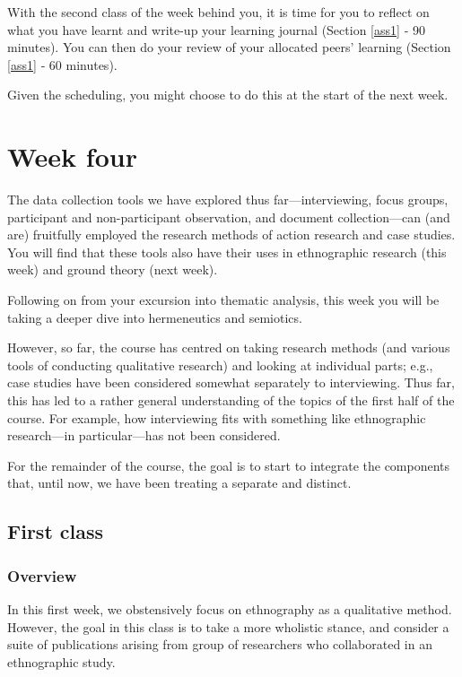 \documentclass[]{book}
\theoremstyle{definition}
\theoremstyle{definition}
\theoremstyle{definition}
\theoremstyle{remark}
\begin{document}
With the second class of the week behind you, it is time for you to
reflect on what you have learnt and write-up your learning journal
(Section \ref{ass1} ‐ 90 minutes). You can then do your review of your
allocated peers' learning (Section \ref{ass1} ‐ 60 minutes).

Given the scheduling, you might choose to do this at the start of the
next week.

\hypertarget{w4-details}{%
\chapter{Week four}\label{w4-details}}

The data collection tools we have explored thus far---interviewing,
focus groups, participant and non-participant observation, and document
collection---can (and are) fruitfully employed the research methods of
action research and case studies. You will find that these tools also
have their uses in ethnographic research (this week) and ground theory
(next week).

Following on from your excursion into thematic analysis, this week you
will be taking a deeper dive into hermeneutics and semiotics.

However, so far, the course has centred on taking research methods (and
various tools of conducting qualitative research) and looking at
individual parts; e.g., case studies have been considered somewhat
separately to interviewing. Thus far, this has led to a rather general
understanding of the topics of the first half of the course. For
example, how interviewing fits with something like ethnographic
research---in particular---has not been considered.

For the remainder of the course, the goal is to start to integrate the
components that, until now, we have been treating a separate and
distinct.

\hypertarget{first-class-3}{%
\section*{First class}\label{first-class-3}}

\hypertarget{overview-6}{%
\subsection*{Overview}\label{overview-6}}

In this first week, we obstensively focus on ethnography as a
qualitative method. However, the goal in this class is to take a more
wholistic stance, and consider a suite of publications arising from
group of researchers who collaborated in an ethnographic study.
\end{document}
